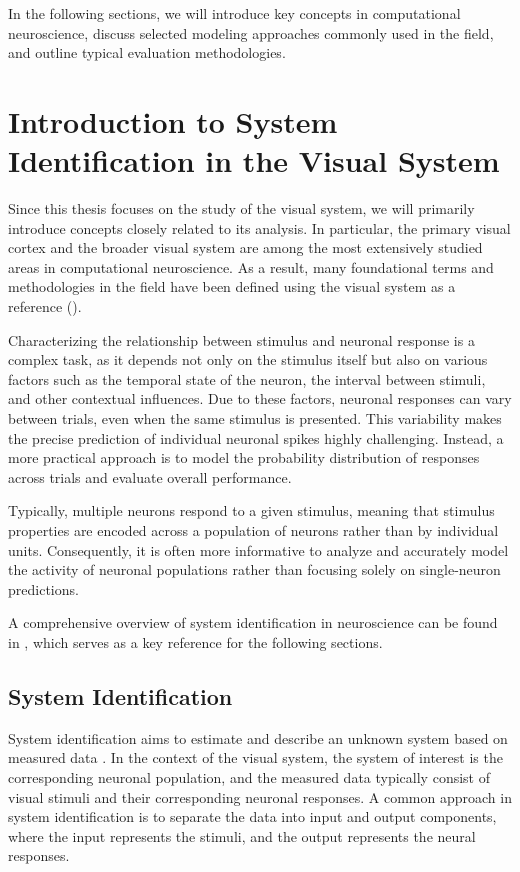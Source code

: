 In the following sections, we will introduce key concepts in computational neuroscience, discuss selected modeling approaches commonly used in the field, and outline typical evaluation methodologies.

\section{Introduction to System Identification in the Visual System}
\label{sec:system_identification}

Since this thesis focuses on the study of the visual system, we will primarily introduce concepts closely related to its analysis. In particular, the primary visual cortex and the broader visual system are among the most extensively studied areas in computational neuroscience. As a result, many foundational terms and methodologies in the field have been defined using the visual system as a reference (\citet{dayan2005theoretical}).

Characterizing the relationship between stimulus and neuronal response is a complex task, as it depends not only on the stimulus itself but also on various factors such as the temporal state of the neuron, the interval between stimuli, and other contextual influences. Due to these factors, neuronal responses can vary between trials, even when the same stimulus is presented. This variability makes the precise prediction of individual neuronal spikes highly challenging. Instead, a more practical approach is to model the probability distribution of responses across trials and evaluate overall performance.

Typically, multiple neurons respond to a given stimulus, meaning that stimulus properties are encoded across a population of neurons rather than by individual units. Consequently, it is often more informative to analyze and accurately model the activity of neuronal populations rather than focusing solely on single-neuron predictions.

A comprehensive overview of system identification in neuroscience can be found in \citet{annurev:/content/journals/10.1146/annurev-vision-091718-014731}, which serves as a key reference for the following sections.

\subsection{System Identification}
\label{subsec:system_identification}

System identification aims to estimate and describe an unknown system based on measured data \citep{annurev:/content/journals/10.1146/annurev-vision-091718-014731}. In the context of the visual system, the system of interest is the corresponding neuronal population, and the measured data typically consist of visual stimuli and their corresponding neuronal responses. A common approach in system identification is to separate the data into input and output components, where the input represents the stimuli, and the output represents the neural responses.

